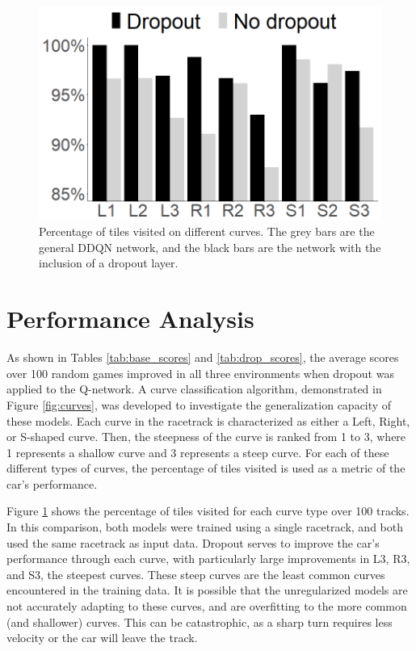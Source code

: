\documentclass{article}
\begin{document}
\begin{figure}[!h]
\begin{minipage}[t]{.3\textwidth}
\end{minipage}
\hspace{.25cm}
\begin{minipage}[t]{.32\textwidth}
  \centering
  \includegraphics[width=\linewidth]{Graphics/curve_plot_v2.png}
  \caption{Percentage of tiles visited on different curves. The grey
    bars are the general DDQN network, and the black bars are the
    network with the inclusion of a dropout layer.} 
  \label{fig:curves_comparison}
\end{minipage}
\vspace{-2.5mm}
\end{figure}

\section{Performance Analysis}
As shown in Tables \ref{tab:base_scores} and \ref{tab:drop_scores},
the average scores over 100 random games improved in all three
environments when dropout was applied to the Q-network. A curve 
classification algorithm, demonstrated in Figure \ref{fig:curves},
was developed to investigate the generalization capacity of these models. 
Each curve in the racetrack is
characterized as either a Left, Right, or S-shaped curve. Then, the
steepness of the curve is ranked from 1 to 3, where 1 represents a
shallow curve and 3 represents a steep curve. 
For each of these different types of curves, the percentage
of tiles visited is used as a metric of the car's performance. 

Figure \ref{fig:curves_comparison} shows the percentage of tiles visited 
for each curve type over 100 tracks. In this comparison, both models were 
trained using a single racetrack, and both used the same racetrack as input data. 
Dropout serves to improve the car's performance through each curve, 
with particularly large improvements in L3, R3, and S3, the steepest curves. 
These steep curves are the least common curves encountered in the training data.
It is possible that the unregularized models are not
accurately adapting to these curves, and are overfitting to the more
common (and shallower) curves. This can be catastrophic, as a sharp
turn requires less velocity or the car will leave the track. 
\end{document}
